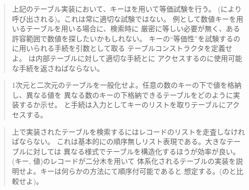 \begin{quote}
上記のテーブル実装において、キーはを用いて等価試験を行う。
(により呼び出される)。これは常に適切な試験ではない。
例として数値キーを用いるテーブルを用いる場合に、検索時に
厳密に等しい必要が無く、ある許容範囲で数値を探したいかもしれない。
キーの``等価性''を試験するのに用いられる手続を引数として取る
テーブルコンストラクタを定義せよ。
は内部テーブルに対して適切な手続とに
アクセスするのに使用可能な手続を返さねばならない。
\end{quote}

\begin{quote}
1次元と二次元のテーブルを一般化せよ。任意の数のキーの下で値を格納し、異なる値を
異なる数のキーの下格納できるテーブルをどのように実装するか示せ。
と手続は入力としてキーのリストを取りテーブルにアクセスする。
\end{quote}

\begin{quote}
上で実装されたテーブルを検索するにはレコードのリストを走査しなければならない。
これは基本的にの順序無しリスト表現である。大きなテーブルに対しては
異なる様式でテーブルを構造化するほうが効率が良い。(キー, 値)のレコードが二分木を用いて
体系化されるテーブルの実装を説明せよ。キーは何らかの方法にて順序付可能であると
想定する。(のと比較せよ)。
\end{quote}

